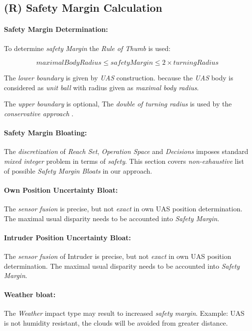 \newpage
\subsection{(R) Safety Margin Calculation}\label{s:safetyMarginCalculation}
\paragraph{Safety Margin Determination:} To determine \emph{safety Margin} the \emph{Rule of Thumb} is used:

\begin{equation}
    maximal Body Radius \le safety Margin \le 2 \times turning Radius
\end{equation}

\noindent The \emph{lower boundary} is given by \emph{UAS} construction. because the \emph{UAS} body is considered as \emph{unit ball} with radius given as \emph{maximal body radius}. 

The \emph{upper boundary} is optional, The \emph{double of \emph{turning radius}} is used by the \emph{conservative approach} \cite{borenstein1991vector}.


\paragraph{Safety Margin Bloating:}  The \emph{discretization} of \emph{Reach Set}, \emph{Operation Space} and \emph{Decisions} imposes standard \emph{mixed integer} problem in terms of \emph{safety}. This section covers \emph{non-exhaustive} list of possible \emph{Safety Margin Bloats} in our approach.

\paragraph{Own Position Uncertainty Bloat:} The \emph{sensor fusion} is precise, but not \emph{exact} in own UAS position determination. The maximal usual disparity needs to be accounted into \emph{Safety Margin}.

\paragraph{Intruder Position Uncertainty Bloat:} The \emph{sensor fusion} of Intruder is precise, but not \emph{exact} in own UAS position determination. The maximal usual disparity needs to be accounted into \emph{Safety Margin}.

\paragraph{Weather bloat:} The \emph{Weather} impact type may result to increased \emph{safety margin}. Example: UAS is not humidity resistant, the clouds will be avoided from greater distance.

